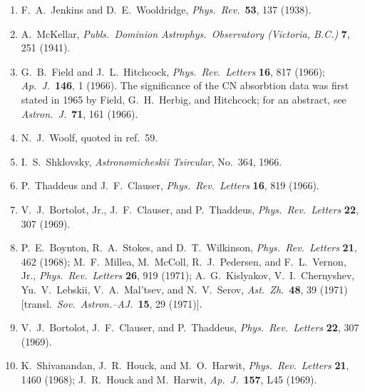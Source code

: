 \begin{enumerate}
  \item{}\label{ch15-ref-55}
  F.~A.~Jenkins and D.~E.~Wooldridge,
  \emph{Phys.\ Rev.}\ \textbf{53}, 137 (1938).

  \item{}\label{ch15-ref-56}
  A.~McKellar, \emph{Publs.\ Dominion Astrophys.\ Observatory
  (Victoria, B.C.)} \textbf{7}, 251 (1941).

  \item{}\label{ch15-ref-57}
  G.~B.~Field and J.~L.~Hitchcock,
  \emph{Phys.\ Rev.\ Letters} \textbf{16}, 817 (1966);
  \emph{Ap.\ J.}\ \textbf{146}, 1 (1966).
  The significance of the CN absorbtion data was first stated in 1965 by
  Field, G.~H.~Herbig, and Hitchcock; for an abstract, see
  \emph{Astron.\ J.}\ \textbf{71}, 161 (1966).

  \item{}\label{ch15-ref-58}
  N.~J.~Woolf, quoted in ref.~59.

  \item[58a.]\label{ch15-ref-58a}
  I.~S.~Shklovsky, \emph{Astronomicheskii Tsircular}, No.~364, 1966.

  \item{}\label{ch15-ref-59}
  P.~Thaddeus and J.~F.~Clauser,
  \emph{Phys.\ Rev.\ Letters} \textbf{16}, 819 (1966).

  \item{}\label{ch15-ref-60}
  V.~J.~Bortolot, Jr., J.~F.~Clauser, and P.~Thaddeus,
  \emph{Phys.\ Rev.\ Letters} \textbf{22}, 307 (1969).

  \item{}\label{ch15-ref-61}
  P.~E.~Boynton, R.~A.~Stokes, and D.~T.~Wilkinson,
  \emph{Phys.\ Rev.\ Letters} \textbf{21}, 462 (1968);
  M.~F.~Millea, M.~McColl, R.~J.~Pedersen, and F.~L.~Vernon, Jr.,
  \emph{Phys.\ Rev.\ Letters} \textbf{26}, 919 (1971);
  A.~G.~Kislyakov, V.~I.~Chernyshev, Yu.~V.~Lebskii, V.~A.~Mal'tsev,
  and N.~V.~Serov, \emph{Ast.\ Zh.}\ \textbf{48}, 39 (1971)
  [transl.\ \emph{Sov.\ Astron.--AJ.}\ \textbf{15}, 29 (1971)].

  \item{}\label{ch15-ref-62}
  V.~J.~Bortolot, J.~F.~Clauser, and P.~Thaddeus,
  \emph{Phys.\ Rev.\ Letters} \textbf{22}, 307 (1969).

  \item{}\label{ch15-ref-63}
  K.~Shivanandan, J.~R.~Houck, and M.~O.~Harwit,
  \emph{Phys.\ Rev.\ Letters} \textbf{21}, 1460 (1968);
  J.~R.~Houck and M.~Harwit, \emph{Ap.\ J.}\ \textbf{157}, L45 (1969).


\end{enumerate}
